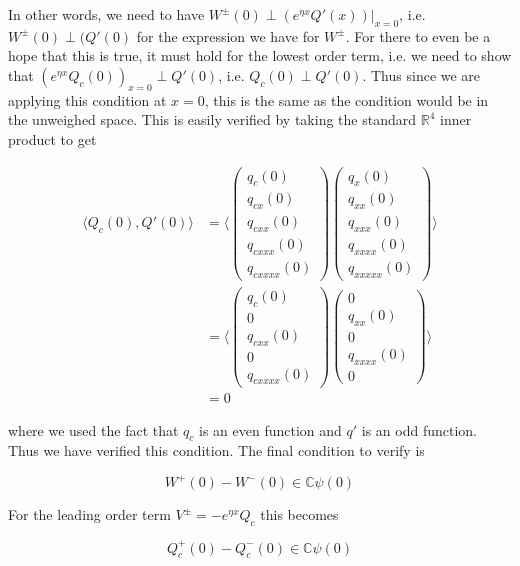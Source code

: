 \documentclass[12pt]{article}
\def\R{{\mathbb R}}
\def\C{{\mathbb C}}
\begin{document}
In other words, we need to have $W^\pm(0) \perp (e^{\eta x} Q'(x))|_{x = 0}$, i.e. $W^\pm(0) \perp (Q'(0)$ for the expression we have for $W^\pm$. For there to even be a hope that this is true, it must hold for the lowest order term, i.e. we need to show that $(e^{\eta x} Q_c(0))_{x = 0} \perp Q'(0)$, i.e. $Q_c(0) \perp Q'(0)$. Thus since we are applying this condition at $x = 0$, this is the same as the condition would be in the unweighed space. This is easily verified by taking the standard $\R^4$ inner product to get

\begin{align*}
\langle Q_c(0), Q'(0) \rangle &= 
\langle 
\begin{pmatrix}q_c(0)\\ q_{cx}(0)\\ q_{cxx}(0)\\q_{cxxx}(0)\\q_{cxxxx}(0) \end{pmatrix}
\begin{pmatrix}q_x(0)\\ q_{xx}(0)\\ q_{xxx}(0)\\q_{xxxx}(0)\\q_{xxxxx}(0) \end{pmatrix}
\rangle\\
&= \langle \begin{pmatrix}q_c(0)\\ 0\\ q_{cxx}(0)\\0\\q_{cxxxx}(0)\end{pmatrix}
\begin{pmatrix}0\\ q_{xx}(0)\\ 0\\q_{xxxx}(0)\\0\end{pmatrix} \rangle \\
&= 0
\end{align*}

where we used the fact that $q_c$ is an even function and $q'$ is an odd function. Thus we have verified this condition. The final condition to verify is 

\[
W^+(0) - W^-(0) \in \C \psi(0) 
\]

For the leading order term $V^\pm = -e^{\eta x} Q_c$ this becomes

\[
Q_c^+(0) - Q_c^-(0) \in \C \psi(0) 
\]
\end{document}

